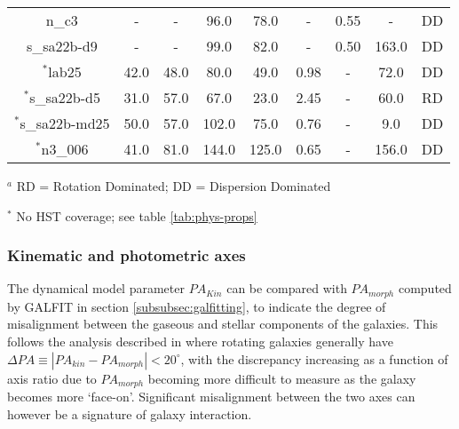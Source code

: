 \documentclass[fleqn,usenatbib]{mn2e}
\begin{document}
\begin{table*}
\begin{threeparttable}
\begin{tabular}{ccccccccc}
n\_c3         & -                    & -                      & 96.0                  & 78.0                   & -        & 0.55       & -  & DD     \\
s\_sa22b-d9   & -                    & -                      & 99.0                  & 82.0                   & -      & 0.50       & 163.0 & DD    \\
$^{*}$lab25         & 42.0                    & 48.0                     & 80.0                  & 49.0                   & 0.98       & -       & 72.0 & DD    \\
$^{*}$s\_sa22b-d5   & 31.0                    & 57.0                     & 67.0                  & 23.0                   & 2.45      & -       & 60.0 & RD     \\
$^{*}$s\_sa22b-md25 & 50.0                    & 57.0                     & 102.0                 & 75.0                   & 0.76       & -       & 9.0 & DD      \\
$^{*}$n3\_006       & 41.0                    & 81.0                     & 144.0                 & 125.0                  & 0.65      & -       & 156.0 & DD 

\end{tabular}
\begin{tablenotes}
      \small
      \item $^{a}$ RD = Rotation Dominated; DD = Dispersion Dominated
      \item $^{*}$ No HST coverage; see table \ref{tab:phys-props}
    \end{tablenotes}
  \end{threeparttable}
  \end{table*}


\subsubsection{Kinematic and photometric axes}\label{subsubsection:kin_and_phot}

The dynamical model parameter $PA_{Kin}$ can be compared with $PA_{morph}$ computed by GALFIT in section \cref{subsubsec:galfitting}, to indicate the degree of misalignment between the gaseous and stellar components of the galaxies.
This follows the analysis described in \citep[e.g.][]{Epinat2008,Epinat2012,Barrera-Ballesteros2014,Barrera-Ballesteros2015,Wisnioski2015,Harrison2017} where rotating galaxies generally have $\Delta PA \equiv |PA_{kin}-PA_{morph}| < 20^{\circ}$, with the discrepancy increasing as a function of axis ratio due to $PA_{morph}$ becoming more difficult to measure as the galaxy becomes more `face-on'.
Significant misalignment between the two axes can however be a signature of galaxy interaction.
\end{document}
